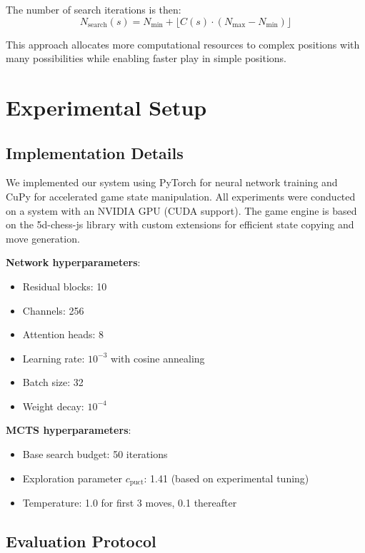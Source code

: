 \documentclass{article}
\begin{document}
The number of search iterations is then:
\begin{equation}
N_{\text{search}}(s) = N_{\min} + \lfloor C(s) \cdot (N_{\max} - N_{\min}) \rfloor
\end{equation}

This approach allocates more computational resources to complex positions with many possibilities while enabling faster play in simple positions.

\section{Experimental Setup}

\subsection{Implementation Details}

We implemented our system using PyTorch for neural network training and CuPy for accelerated game state manipulation. All experiments were conducted on a system with an NVIDIA GPU (CUDA support). The game engine is based on the 5d-chess-js library with custom extensions for efficient state copying and move generation.

\textbf{Network hyperparameters}:
\begin{itemize}
    \item Residual blocks: 10
    \item Channels: 256
    \item Attention heads: 8
    \item Learning rate: $10^{-3}$ with cosine annealing
    \item Batch size: 32
    \item Weight decay: $10^{-4}$
\end{itemize}

\textbf{MCTS hyperparameters}:
\begin{itemize}
    \item Base search budget: 50 iterations
    \item Exploration parameter $c_{\text{puct}}$: 1.41 (based on experimental tuning)
    \item Temperature: 1.0 for first 3 moves, 0.1 thereafter
\end{itemize}

\subsection{Evaluation Protocol}
\end{document}
